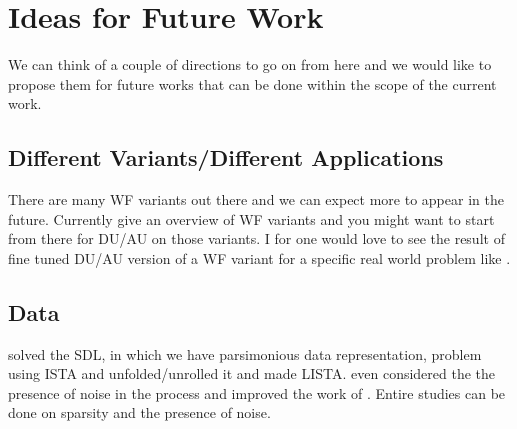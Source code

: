 



\section*{Ideas for Future Work}

We can think of a couple of directions to go on from here and we would like to propose them for future works that can be done within the scope of 
the current work.

\subsection*{Different Variants/Different Applications}

There are many \ac{WF}\cite{Jaganathan2015}\cite{Liu2019} variants out there and we can expect more to appear in the future. 
Currently \cite{Jaganathan2015}\cite{Liu2019}\cite{Chandra2017} give an overview of \ac{WF} variants and you might want to start from there for 
\ac{DU}/\ac{AU}\cite{Monga2019} on those variants. I for one would love to see the result of fine tuned 
\ac{DU}/\ac{AU}\cite{Monga2019} version of a \ac{WF} variant for a specific real world problem like \cite{Fogel2013}. 

\subsection*{Data}

\cite{Daubechies2003} solved the \ac{SDL}, in which we have parsimonious \cite{Foucart2013} data representation, 
problem using \ac{ISTA} and \cite{Gregor2010} unfolded/unrolled it and made \ac{LISTA}. 
\cite{Aberdam2020} even considered the the presence of noise in the process and improved the work of \cite{Gregor2010}. 
Entire studies can be done on sparsity and the presence of noise.

